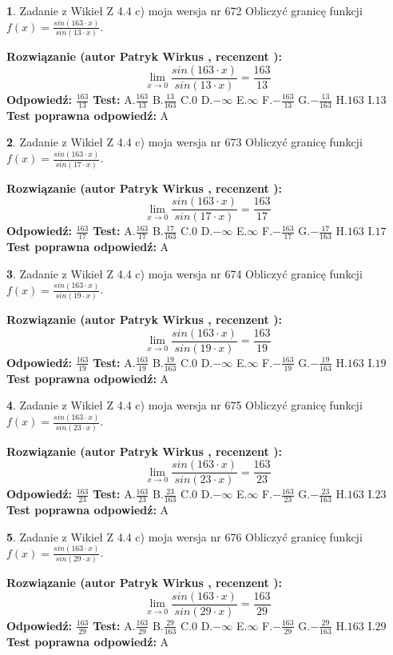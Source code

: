 \documentclass[12pt, a4paper]{article}
\theoremstyle{definition} %
\newtheorem{zad}{}
\newcommand{\zadStart}[1]{\begin{zad}#1\newline}
\newcommand{\zadStop}{\end{zad}}
\newcommand{\rozwStart}[2]{\noindent \textbf{Rozwiązanie (autor #1 , recenzent #2): }\newline}
\newcommand{\rozwStop}{\newline}
\newcommand{\odpStart}{\noindent \textbf{Odpowiedź:}\newline}
\newcommand{\odpStop}{\newline}
\newcommand{\testStart}{\noindent \textbf{Test:}\newline}
\newcommand{\testStop}{\newline}
\newcommand{\kluczStart}{\noindent \textbf{Test poprawna odpowiedź:}\newline}
\newcommand{\kluczStop}{\newline}
\begin{document}
\zadStart{Zadanie z Wikieł Z 4.4 c) moja wersja nr 672}
Obliczyć granicę funkcji $f(x)=\frac{sin(163\cdot x)}{sin(13\cdot x)}$.
\zadStop
\rozwStart{Patryk Wirkus}{}
$$\lim\limits_{x\to 0}\frac{sin(163\cdot x)}{sin(13\cdot x)}=
\frac{163}{13}$$
\rozwStop
\odpStart
$\frac{163}{13}$
\odpStop
\testStart
A.$\frac{163}{13}$
B.$\frac{13}{163}$
C.$0$
D.$-\infty$
E.$\infty$
F.$-\frac{163}{13}$
G.$-\frac{13}{163}$
H.$163$
I.$13$
\testStop
\kluczStart
A
\kluczStop



\zadStart{Zadanie z Wikieł Z 4.4 c) moja wersja nr 673}
Obliczyć granicę funkcji $f(x)=\frac{sin(163\cdot x)}{sin(17\cdot x)}$.
\zadStop
\rozwStart{Patryk Wirkus}{}
$$\lim\limits_{x\to 0}\frac{sin(163\cdot x)}{sin(17\cdot x)}=
\frac{163}{17}$$
\rozwStop
\odpStart
$\frac{163}{17}$
\odpStop
\testStart
A.$\frac{163}{17}$
B.$\frac{17}{163}$
C.$0$
D.$-\infty$
E.$\infty$
F.$-\frac{163}{17}$
G.$-\frac{17}{163}$
H.$163$
I.$17$
\testStop
\kluczStart
A
\kluczStop



\zadStart{Zadanie z Wikieł Z 4.4 c) moja wersja nr 674}
Obliczyć granicę funkcji $f(x)=\frac{sin(163\cdot x)}{sin(19\cdot x)}$.
\zadStop
\rozwStart{Patryk Wirkus}{}
$$\lim\limits_{x\to 0}\frac{sin(163\cdot x)}{sin(19\cdot x)}=
\frac{163}{19}$$
\rozwStop
\odpStart
$\frac{163}{19}$
\odpStop
\testStart
A.$\frac{163}{19}$
B.$\frac{19}{163}$
C.$0$
D.$-\infty$
E.$\infty$
F.$-\frac{163}{19}$
G.$-\frac{19}{163}$
H.$163$
I.$19$
\testStop
\kluczStart
A
\kluczStop



\zadStart{Zadanie z Wikieł Z 4.4 c) moja wersja nr 675}
Obliczyć granicę funkcji $f(x)=\frac{sin(163\cdot x)}{sin(23\cdot x)}$.
\zadStop
\rozwStart{Patryk Wirkus}{}
$$\lim\limits_{x\to 0}\frac{sin(163\cdot x)}{sin(23\cdot x)}=
\frac{163}{23}$$
\rozwStop
\odpStart
$\frac{163}{23}$
\odpStop
\testStart
A.$\frac{163}{23}$
B.$\frac{23}{163}$
C.$0$
D.$-\infty$
E.$\infty$
F.$-\frac{163}{23}$
G.$-\frac{23}{163}$
H.$163$
I.$23$
\testStop
\kluczStart
A
\kluczStop



\zadStart{Zadanie z Wikieł Z 4.4 c) moja wersja nr 676}
Obliczyć granicę funkcji $f(x)=\frac{sin(163\cdot x)}{sin(29\cdot x)}$.
\zadStop
\rozwStart{Patryk Wirkus}{}
$$\lim\limits_{x\to 0}\frac{sin(163\cdot x)}{sin(29\cdot x)}=
\frac{163}{29}$$
\rozwStop
\odpStart
$\frac{163}{29}$
\odpStop
\testStart
A.$\frac{163}{29}$
B.$\frac{29}{163}$
C.$0$
D.$-\infty$
E.$\infty$
F.$-\frac{163}{29}$
G.$-\frac{29}{163}$
H.$163$
I.$29$
\testStop
\kluczStart
A
\kluczStop
\end{document}
